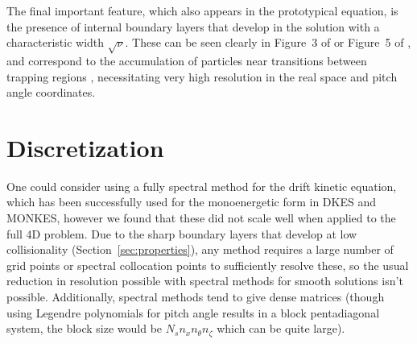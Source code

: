 \documentclass[11pt]{article}
\begin{document}
The final important feature, which also appears in the prototypical equation, is
the presence of internal boundary layers that develop in the solution with a
characteristic width $\sqrt{\nu}$. These can be seen clearly in Figure~3 of
\cite{albert2025convergence} or Figure~5 of \cite{landreman2012local}, and correspond
to the accumulation of particles near transitions between trapping regions
\cite{hinton_transport_1973, ho_neoclassical_1987}, necessitating very high resolution
in the real space and pitch angle coordinates.

\section{Discretization}
\label{sec:discretization}

One could consider using a fully spectral method for the drift kinetic
equation, which has been successfully used for the monoenergetic form in DKES
and MONKES, however we found that these did not scale well when applied to the
full 4D problem. Due to the sharp boundary layers that develop at low
collisionality (Section~\ref{sec:properties}), any method requires a large number of
grid points or spectral collocation points to sufficiently resolve these, so the usual
reduction in resolution possible with spectral methods for smooth solutions isn't possible.
Additionally, spectral methods tend to give dense matrices (though using
Legendre polynomials for pitch angle results in a block pentadiagonal system,
the block size would be $N_s n_x n_\theta n_\zeta$ which can be quite large).
\end{document}
